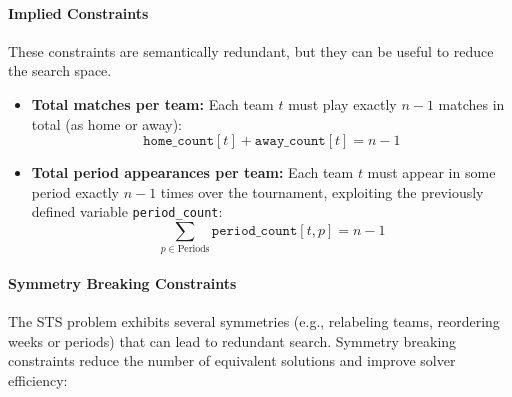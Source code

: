 \documentclass[11pt]{article}
\begin{document}
\paragraph{Implied Constraints}
These constraints are semantically redundant, but they can be useful to reduce the search space.

\begin{itemize}
    \item \textbf{Total matches per team:}  
    Each team $t$ must play exactly $n-1$ matches in total (as home or away):
    \begin{equation*}
        \texttt{home\_count}[t] + \texttt{away\_count}[t] = n - 1
    \end{equation*}

    \item \textbf{Total period appearances per team:}  
    Each team $t$ must appear in some period exactly $n - 1$ times over the tournament, exploiting the previously defined variable \texttt{period\_count}:
    \begin{equation*}
        \sum_{p \in \text{Periods}} \texttt{period\_count}[t, p] = n - 1
    \end{equation*}
\end{itemize}

\paragraph{Symmetry Breaking Constraints}

The STS problem exhibits several symmetries (e.g., relabeling teams, reordering weeks or periods) that can lead to redundant search. Symmetry breaking constraints reduce the number of equivalent solutions and improve solver efficiency:
\end{document}
